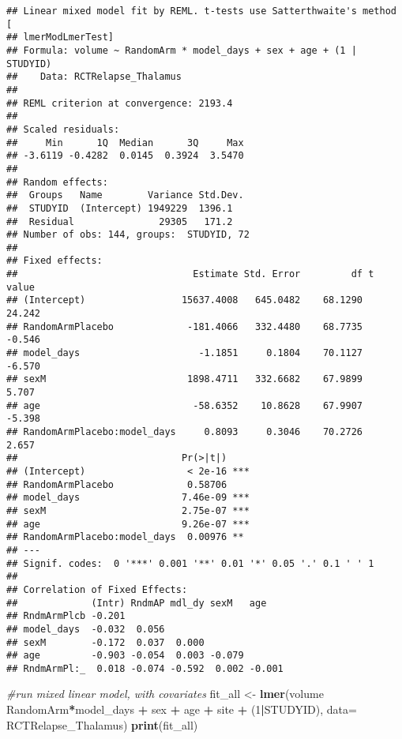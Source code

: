 \documentclass[]{article}
\newenvironment{Shaded}{\begin{snugshade}}{\end{snugshade}}
\newcommand{\KeywordTok}[1]{\textcolor[rgb]{0.13,0.29,0.53}{\textbf{#1}}}
\newcommand{\DataTypeTok}[1]{\textcolor[rgb]{0.13,0.29,0.53}{#1}}
\newcommand{\DecValTok}[1]{\textcolor[rgb]{0.00,0.00,0.81}{#1}}
\newcommand{\StringTok}[1]{\textcolor[rgb]{0.31,0.60,0.02}{#1}}
\newcommand{\CommentTok}[1]{\textcolor[rgb]{0.56,0.35,0.01}{\textit{#1}}}
\newcommand{\OperatorTok}[1]{\textcolor[rgb]{0.81,0.36,0.00}{\textbf{#1}}}
\newcommand{\NormalTok}[1]{#1}
\theoremstyle{definition}
\theoremstyle{definition}
\theoremstyle{definition}
\theoremstyle{remark}
\begin{document}
\begin{verbatim}
## Linear mixed model fit by REML. t-tests use Satterthwaite's method [
## lmerModLmerTest]
## Formula: volume ~ RandomArm * model_days + sex + age + (1 | STUDYID)
##    Data: RCTRelapse_Thalamus
## 
## REML criterion at convergence: 2193.4
## 
## Scaled residuals: 
##     Min      1Q  Median      3Q     Max 
## -3.6119 -0.4282  0.0145  0.3924  3.5470 
## 
## Random effects:
##  Groups   Name        Variance Std.Dev.
##  STUDYID  (Intercept) 1949229  1396.1  
##  Residual               29305   171.2  
## Number of obs: 144, groups:  STUDYID, 72
## 
## Fixed effects:
##                               Estimate Std. Error         df t value
## (Intercept)                 15637.4008   645.0482    68.1290  24.242
## RandomArmPlacebo             -181.4066   332.4480    68.7735  -0.546
## model_days                     -1.1851     0.1804    70.1127  -6.570
## sexM                         1898.4711   332.6682    67.9899   5.707
## age                           -58.6352    10.8628    67.9907  -5.398
## RandomArmPlacebo:model_days     0.8093     0.3046    70.2726   2.657
##                             Pr(>|t|)    
## (Intercept)                  < 2e-16 ***
## RandomArmPlacebo             0.58706    
## model_days                  7.46e-09 ***
## sexM                        2.75e-07 ***
## age                         9.26e-07 ***
## RandomArmPlacebo:model_days  0.00976 ** 
## ---
## Signif. codes:  0 '***' 0.001 '**' 0.01 '*' 0.05 '.' 0.1 ' ' 1
## 
## Correlation of Fixed Effects:
##             (Intr) RndmAP mdl_dy sexM   age   
## RndmArmPlcb -0.201                            
## model_days  -0.032  0.056                     
## sexM        -0.172  0.037  0.000              
## age         -0.903 -0.054  0.003 -0.079       
## RndmArmPl:_  0.018 -0.074 -0.592  0.002 -0.001
\end{verbatim}

\begin{Shaded}
\begin{Highlighting}[]
\CommentTok{#run mixed linear model, with covariates}
\NormalTok{  fit_all <-}\StringTok{ }\KeywordTok{lmer}\NormalTok{(volume }\OperatorTok{~}\StringTok{ }\NormalTok{RandomArm}\OperatorTok{*}\NormalTok{model_days }\OperatorTok{+}\StringTok{ }\NormalTok{sex }\OperatorTok{+}\StringTok{ }\NormalTok{age }\OperatorTok{+}\StringTok{ }\NormalTok{site }\OperatorTok{+}\StringTok{ }\NormalTok{(}\DecValTok{1}\OperatorTok{|}\NormalTok{STUDYID), }\DataTypeTok{data=}\NormalTok{ RCTRelapse_Thalamus)}
  \KeywordTok{print}\NormalTok{(fit_all)}
\end{Highlighting}
\end{Shaded}
\end{document}

